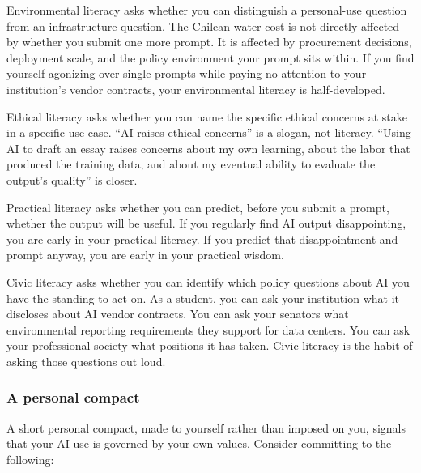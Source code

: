\documentclass[12pt]{article}
\begin{document}
Environmental literacy asks whether you can distinguish a personal-use question from an infrastructure question. The Chilean water cost is not directly affected by whether you submit one more prompt. It is affected by procurement decisions, deployment scale, and the policy environment your prompt sits within. If you find yourself agonizing over single prompts while paying no attention to your institution's vendor contracts, your environmental literacy is half-developed.

Ethical literacy asks whether you can name the specific ethical concerns at stake in a specific use case. ``AI raises ethical concerns'' is a slogan, not literacy. ``Using AI to draft an essay raises concerns about my own learning, about the labor that produced the training data, and about my eventual ability to evaluate the output's quality'' is closer.

Practical literacy asks whether you can predict, before you submit a prompt, whether the output will be useful. If you regularly find AI output disappointing, you are early in your practical literacy. If you predict that disappointment and prompt anyway, you are early in your practical wisdom.

Civic literacy asks whether you can identify which policy questions about AI you have the standing to act on. As a student, you can ask your institution what it discloses about AI vendor contracts. You can ask your senators what environmental reporting requirements they support for data centers. You can ask your professional society what positions it has taken. Civic literacy is the habit of asking those questions out loud.

\subsubsection*{A personal compact}

A short personal compact, made to yourself rather than imposed on you, signals that your AI use is governed by your own values. Consider committing to the following:
\end{document}
